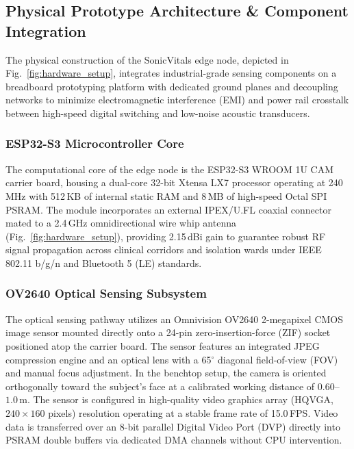 \documentclass[journal]{IEEEtran}
\begin{document}
\subsection{Physical Prototype Architecture \& Component Integration}

The physical construction of the SonicVitals edge node, depicted in Fig.~\ref{fig:hardware_setup}, integrates industrial-grade sensing components on a breadboard prototyping platform with dedicated ground planes and decoupling networks to minimize electromagnetic interference (EMI) and power rail crosstalk between high-speed digital switching and low-noise acoustic transducers.

\subsubsection{ESP32-S3 Microcontroller Core}
The computational core of the edge node is the ESP32-S3 WROOM 1U CAM carrier board, housing a dual-core 32-bit Xtensa LX7 processor operating at 240\,MHz with 512\,KB of internal static RAM and 8\,MB of high-speed Octal SPI PSRAM. The module incorporates an external IPEX/U.FL coaxial connector mated to a 2.4\,GHz omnidirectional wire whip antenna (Fig.~\ref{fig:hardware_setup}), providing 2.15\,dBi gain to guarantee robust RF signal propagation across clinical corridors and isolation wards under IEEE 802.11 b/g/n and Bluetooth 5 (LE) standards.

\subsubsection{OV2640 Optical Sensing Subsystem}
The optical sensing pathway utilizes an Omnivision OV2640 2-megapixel CMOS image sensor mounted directly onto a 24-pin zero-insertion-force (ZIF) socket positioned atop the carrier board. The sensor features an integrated JPEG compression engine and an optical lens with a 65$^\circ$ diagonal field-of-view (FOV) and manual focus adjustment. In the benchtop setup, the camera is oriented orthogonally toward the subject's face at a calibrated working distance of $0.60$--$1.0$\,m. The sensor is configured in high-quality video graphics array (HQVGA, $240 \times 160$ pixels) resolution operating at a stable frame rate of 15.0\,FPS. Video data is transferred over an 8-bit parallel Digital Video Port (DVP) directly into PSRAM double buffers via dedicated DMA channels without CPU intervention.
\end{document}

